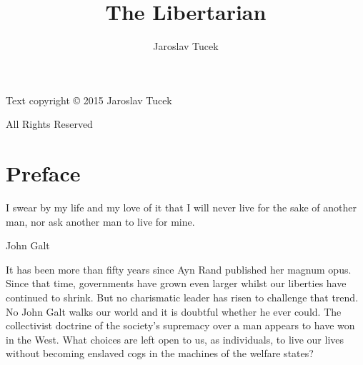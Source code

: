 \title{The Libertarian}
\author{Jaroslav Tucek}
\date{}

\newcommand{\sectionline}{
	\nointerlineskip \vspace{\baselineskip}
	\hspace{\fill}\rule{0.15\linewidth}{.7pt}\hspace{\fill}
	\par\nointerlineskip \vspace{\baselineskip}
}

\newcommand{\makecopyright}{
	\clearpage
	\begin{center}
	Text copyright \copyright{} 2015 Jaroslav Tucek

	All Rights Reserved
	\end{center}
	\vfill
	\clearpage
}

\usepackage{graphicx}
\usepackage{epigraph}
\usepackage[utf8]{inputenc}
\usepackage{hyperref}
\usepackage[ngerman,english]{babel}

\hypersetup{
	colorlinks,
	citecolor=black,
	filecolor=black,
	linkcolor=black,
	urlcolor=black
}




\frontmatter

\makecover
\maketitle
\makecopyright
\tableofcontents

\mainmatter

\chapter*{Preface}

\epigraph{I swear by my life and my love of it that I will never live for the sake of another man, nor ask another man to live for mine.}{John Galt}

\firstparagraph

It has been more than fifty years since Ayn Rand published her magnum opus. Since that time, governments have grown even larger whilst our liberties have continued to shrink. But no charismatic leader has risen to challenge that trend. No John Galt walks our world and it is doubtful whether he ever could. The collectivist doctrine of the society's supremacy over a man appears to have won in the West. What choices are left open to us, as individuals, to live our lives without becoming enslaved cogs in the machines of the welfare states?

